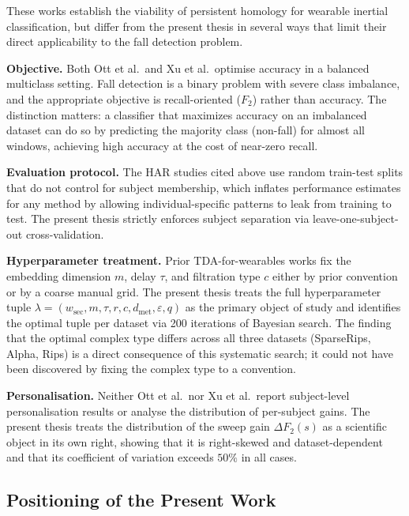 \documentclass[onluarkali,ingilizce,yukseklisans,karton,LisansustuEgitim]{itutez}
\providecommand{\1}{\mathbf{1}}
\begin{document}
These works establish the viability of persistent homology for wearable inertial
classification, but differ from the present thesis in several ways that limit their
direct applicability to the fall detection problem.

\textbf{Objective.}  Both Ott et al.\ and Xu et al.\ optimise accuracy in a balanced
multiclass setting.  Fall detection is a binary problem with severe class imbalance,
and the appropriate objective is recall-oriented ($F_2$) rather than accuracy.
The distinction matters: a classifier that maximizes accuracy on an imbalanced dataset
can do so by predicting the majority class (non-fall) for almost all windows, achieving
high accuracy at the cost of near-zero recall.

\textbf{Evaluation protocol.}  The HAR studies cited above use random train-test
splits that do not control for subject membership, which inflates performance
estimates for any method by allowing individual-specific patterns to leak from
training to test.  The present thesis strictly enforces subject separation via
leave-one-subject-out cross-validation.

\textbf{Hyperparameter treatment.}  Prior TDA-for-wearables works fix the embedding
dimension $m$, delay $\tau$, and filtration type $c$ either by prior convention or
by a coarse manual grid.  The present thesis treats the full hyperparameter tuple
$\lambda=(w_\mathrm{sec}, m, \tau, r, c, d_\mathrm{met}, \varepsilon, q)$ as the
primary object of study and identifies the optimal tuple per dataset via 200
iterations of Bayesian search.  The finding that the optimal complex type differs
across all three datasets (SparseRips, Alpha, Rips) is a direct consequence of this
systematic search; it could not have been discovered by fixing the complex type to a
convention.

\textbf{Personalisation.}  Neither Ott et al.\ nor Xu et al.\ report subject-level
personalisation results or analyse the distribution of per-subject gains.  The
present thesis treats the distribution of the sweep gain $\Delta F_2(s)$ as a
scientific object in its own right, showing that it is right-skewed and
dataset-dependent and that its coefficient of variation exceeds $50\%$ in all cases.

\subsection{Positioning of the Present Work}
\label{subsec:rw-positioning}
\end{document}
